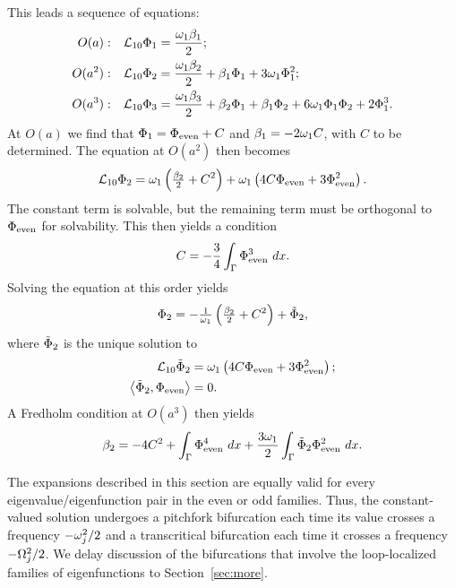 \documentclass{article}
\numberwithin{equation}{section}
\numberwithin{figure}{section}
\begin{document}
This leads a sequence of equations:
\begin{align*}
O(a): & & \mathcal{L}_{10} \Phi_1 & = \frac{ \omega_1 \beta_1}{2}; \\
O(a^2): & & \mathcal{L}_{10} \Phi_2 & = 
\frac{ \omega_1\beta_2 }{2}
+\beta_1 \Phi_1
+3  \omega_1 \Phi_1^2
; \\
O(a^3): & & \mathcal{L}_{10} \Phi_3 & = 
\frac{ \omega_1\beta_3}{2}
+\beta_2 \Phi_1
+\beta_1 \Phi_2
+6  \omega_1 \Phi_1 \Phi_2
+2 \Phi_1^3.
\end{align*}
At $O(a)$ we find that $\Phi_1 = \Phi_{\rm even} + C$ and $\beta_1 = -2 \omega_1 C$, with $C$  to be determined. The equation at $O(a^2)$ then becomes
$$
\mathcal{L}_{10} \Phi_2 = \omega_1 \left(\tfrac{\beta_2}{2}+C^2 \right) +  \omega_1 \left( 4 C \Phi_{\rm even} + 3 \Phi_{\rm even}^2 \right).
$$
The constant term is solvable, but the remaining term must be orthogonal to $\Phi_{\rm even}$ for solvability. This then yields a condition
\begin{equation}
C = -\frac{3}{4} \int_{\Gamma} \Phi_{\rm even}^3 \ dx.
\label{C}
\end{equation}
Solving the equation at this order yields
$$
\Phi_2 = -\tfrac{1}{\omega_1} \left(\tfrac{\beta_2}{2} + C^2 \right) + \tilde{\Phi}_2,
$$
where $\tilde{\Phi}_2$ is the unique solution to 
\begin{align*}
\mathcal{L}_{10} \tilde{\Phi}_2 & =  \omega_1 \left( 4 C \Phi_{\rm even} + 3 \Phi_{\rm even}^2 \right);\\
\left\langle \tilde{\Phi}_2, \Phi_{\rm even} \right\rangle & = 0.
\end{align*}
A Fredholm condition at $O(a^3)$ then yields
$$
\beta_2  = -4 C^2 + \int_{\Gamma} \Phi_{\rm even}^4 \ dx 
+ \frac{3\omega_1}{2} \int_{\Gamma} \tilde{\Phi}_2 \Phi_{\rm even}^2 \ dx.
$$

\begin{rem}
The expansions described in this section are equally valid for every eigenvalue/eigenfunction pair in the even or odd families. Thus, the constant-valued solution undergoes a pitchfork bifurcation each time its value crosses a frequency $-\omega_j^2/2$ and a transcritical bifurcation each time it crosses a frequency $-\Omega_j^2/2$. We delay discussion of the bifurcations that involve the loop-localized families of eigenfunctions to Section~\ref{sec:more}.
\end{rem}
\end{document}
